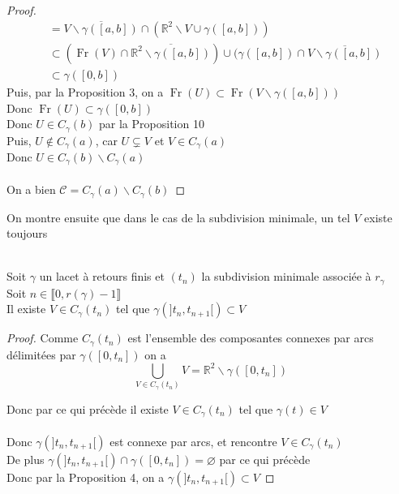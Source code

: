 \documentclass{article}
\begin{document}
\begin{flushleft}
\begin{proof}
\begin{align*}
        &= \overline{V \backslash \gamma([a, b])} \cap (\mathbb{R}^2 \backslash V \cup \gamma([a, b]))\\
        &\subset (\operatorname{Fr}(V) \cap \overline{\mathbb{R}^2 \backslash \gamma([a, b])})
        \cup (\gamma([a, b]) \cap \overline{V \backslash \gamma([a, b])}\\
        &\subset \gamma([0, b])
    \end{align*}
    Puis, par la Proposition 3, on a $\operatorname{Fr}(U) \subset \operatorname{Fr}(V \backslash \gamma([a, b]))$\\
    Donc $\operatorname{Fr}(U) \subset \gamma([0, b])$\\
    Donc $U \in C_{\gamma}(b)$ par la Proposition 10\\
    Puis, $U \notin C_{\gamma}(a)$, car $U \subsetneq V$ et $V \in C_{\gamma}(a)$\\
    Donc $U \in C_{\gamma}(b) \backslash C_{\gamma}(a)$
    \\~\\
    On a bien $\mathcal{C} = C_{\gamma}(a) \backslash C_{\gamma}(b)$
\end{proof}
\vspace*{0.5cm}
On montre ensuite que dans le cas de la subdivision minimale, un tel $V$ existe toujours
\\~\\

\begin{tcolorbox}[colback = purple!20!white, colframe = purple!60!white, title = Proposition 12]
    Soit $\gamma$ un lacet à retours finis et $(t_n)$ la subdivision minimale associée à $r_{\gamma}$\\
    Soit $n \in \llbracket 0, r(\gamma)-1 \rrbracket$\\
    Il existe $V \in C_{\gamma}(t_n)$ tel que $\gamma(]t_n, t_{n+1}[) \subset V$
\end{tcolorbox}

\begin{proof}
    Comme $C_{\gamma}(t_n)$ est l'ensemble des composantes connexes par arcs délimitées par $\gamma([0, t_n])$ on a
    \[ \bigcup_{V \in C_{\gamma}(t_n)} V = \mathbb{R}^2 \backslash \gamma([0, t_n]) \]
    
    Donc par ce qui précède il existe $V \in C_{\gamma}(t_n)$ tel que $\gamma(t) \in V$
    \\~\\
    Donc $\gamma(]t_n, t_{n+1}[)$ est connexe par arcs, et rencontre $V \in C_{\gamma}(t_n)$\\
    De plus $\gamma(]t_n, t_{n+1}[) \cap \gamma([0, t_n]) = \varnothing$ par ce qui précède\\
    Donc par la Proposition 4, on a $\gamma(]t_n, t_{n+1}[) \subset V$
\end{proof}


\end{flushleft}
\end{document}

